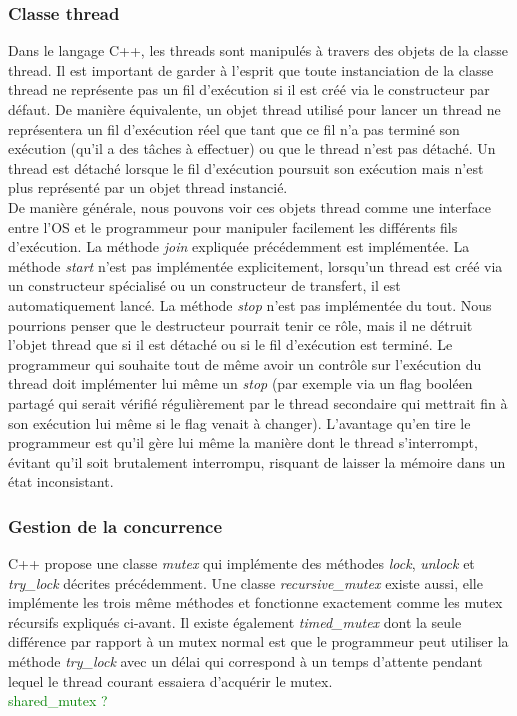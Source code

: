 \documentclass[a4paper,twoside,10pt,english,french,twocolumn]{article}
\theoremstyle{definition}
\theoremstyle{remark}
\theoremstyle{plain}
\begin{document}
\subsubsection*{Classe thread}
Dans le langage C++, les threads sont manipulés à travers des objets de la classe thread. Il est important de garder à l'esprit que toute instanciation de la classe thread ne représente pas un fil d'exécution si il est créé via le constructeur par défaut. De manière équivalente, un objet thread utilisé pour lancer un thread ne représentera un fil d'exécution réel que tant que ce fil n'a pas terminé son exécution (qu'il a des tâches à effectuer) ou que le thread n'est pas détaché. Un thread est détaché lorsque le fil d'exécution poursuit son exécution mais n'est plus représenté par un objet thread instancié.\\
De manière générale, nous pouvons voir ces objets thread comme une interface entre l'OS et le programmeur pour manipuler facilement les différents fils d'exécution. La méthode \textit{join} expliquée précédemment est implémentée. La méthode \textit{start} n'est pas implémentée explicitement, lorsqu'un thread est créé via un constructeur spécialisé ou un constructeur de transfert, il est automatiquement lancé. La méthode \textit{stop} n'est pas implémentée du tout. Nous pourrions penser que le destructeur pourrait tenir ce rôle, mais il ne détruit l'objet thread que si il est détaché ou si le fil d'exécution est terminé. Le programmeur qui souhaite tout de même avoir un contrôle sur l'exécution du thread doit implémenter lui même un \textit{stop} (par exemple via un flag booléen partagé qui serait vérifié régulièrement par le thread secondaire qui mettrait fin à son exécution lui même si le flag venait à changer). L'avantage qu'en tire le programmeur est qu'il gère lui même la manière dont le thread s'interrompt, évitant qu'il soit brutalement interrompu, risquant de laisser la mémoire dans un état inconsistant.\\
\subsubsection*{Gestion de la concurrence}
C++ propose une classe \textit{mutex} qui implémente des méthodes \textit{lock}, \textit{unlock} et \textit{try\_lock} décrites précédemment. Une classe \textit{recursive\_mutex} existe aussi, elle implémente les trois même méthodes et fonctionne exactement comme les mutex récursifs expliqués ci-avant. Il existe également \textit{timed\_mutex} dont la seule différence par rapport à un mutex normal est que le programmeur peut utiliser la méthode \textit{try\_lock} avec un délai qui correspond à un temps d'attente pendant lequel le thread courant essaiera d'acquérir le mutex.\\
\textcolor{green}{shared\_mutex ?}
\end{document}
